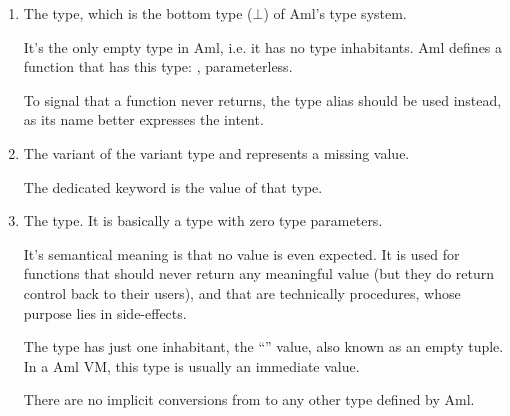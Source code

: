 \begin{enumerate}
  \item The  type, which is the bottom type ($\bot$) of Aml's type system. 
  
  It's the only empty type in Aml, i.e. it has no type inhabitants. Aml defines a function that has this type: , parameterless. 
  
  To signal that a function never returns, the type alias  should be used instead, as its name better expresses the intent. 

  \item The  variant of the  variant type and represents a missing value.
  
  The dedicated keyword  is the value of that type. 
  
  \item The  type. It is basically a  type with zero type parameters. 
  
  It's semantical meaning is that no value is even expected. It is used for functions that should never return any meaningful value (but they do return control back to their users), and that are technically procedures, whose purpose lies in side-effects. 
  
  The type has just one inhabitant, the ``\code{()}'' value, also known as an empty tuple. In a Aml VM, this type is usually an immediate value.
  
  There are no implicit conversions from  to any other type defined by Aml. 
\end{enumerate}






